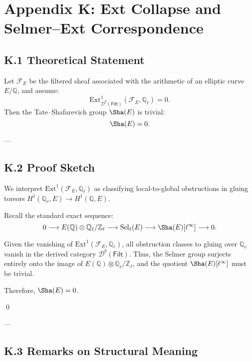 \section*{Appendix K: Ext Collapse and Selmer--Ext Correspondence}

\subsection*{K.1 Theoretical Statement}

\begin{theorem}
Let \( \mathcal{F}_E \) be the filtered sheaf associated with the arithmetic of an elliptic curve \( E/\mathbb{Q} \), and assume:
\[
\mathrm{Ext}^1_{\mathcal{D}^b(\mathsf{Filt})}(\mathcal{F}_E, \mathbb{Q}_\ell) = 0.
\]
Then the Tate–Shafarevich group \( \Sha(E) \) is trivial:
\[
\Sha(E) = 0.
\]
\end{theorem}

---

\subsection*{K.2 Proof Sketch}

We interpret \( \mathrm{Ext}^1(\mathcal{F}_E, \mathbb{Q}_\ell) \) as classifying local-to-global obstructions in gluing torsors \( H^1(\mathbb{Q}_v, E) \to H^1(\mathbb{Q}, E) \).  

Recall the standard exact sequence:
\[
0 \longrightarrow E(\mathbb{Q}) \otimes \mathbb{Q}_\ell/\mathbb{Z}_\ell \longrightarrow \mathrm{Sel}_\ell(E) \longrightarrow \Sha(E)[\ell^\infty] \longrightarrow 0.
\]

Given the vanishing of \( \mathrm{Ext}^1(\mathcal{F}_E, \mathbb{Q}_\ell) \), all obstruction classes to gluing over \( \mathbb{Q}_v \) vanish in the derived category \( \mathcal{D}^b(\mathsf{Filt}) \). Thus, the Selmer group surjects entirely onto the image of \( E(\mathbb{Q}) \otimes \mathbb{Q}_\ell/\mathbb{Z}_\ell \), and the quotient \( \Sha(E)[\ell^\infty] \) must be trivial.

Therefore, \( \Sha(E) = 0 \).

\qed

---

\subsection*{K.3 Remarks on Structural Meaning}

